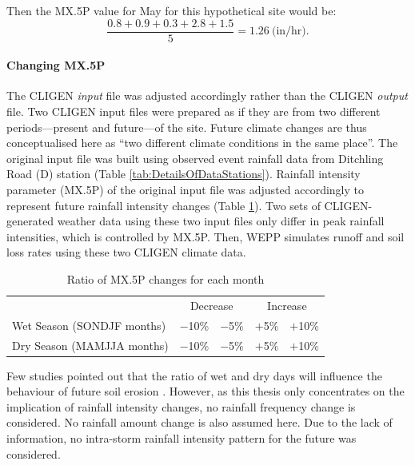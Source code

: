 Then the {MX.5P} value for May for this hypothetical site would be:
\begin{equation}
  \frac{0.8+0.9+0.3+2.8+1.5}{5} = 1.26 \ \textrm{(in/hr)}.
\end{equation}

\paragraph{Changing {MX.5P}} The CLIGEN \emph{input} file was adjusted
accordingly rather than the CLIGEN \textit{output} file. Two CLIGEN input files
were prepared as if they are from two different periods---present and
future---of the site. Future climate changes are thus conceptualised here as
``two different climate conditions in the same place''. The original input file
was built using observed event rainfall data from Ditchling Road (D) station
(Table \ref{tab:DetailsOfDataStations}). Rainfall intensity parameter ({MX.5P})
of the original input file was adjusted accordingly to represent future rainfall
intensity changes (Table \ref{tab:MX5PChanges}). Two sets of CLIGEN-generated
weather data using these two input files only differ in peak rainfall
intensities, which is controlled by {MX.5P}. Then, WEPP simulates runoff and
soil loss rates using these two CLIGEN climate data.

\begin{table}[htpb]
  \centering
  \caption{Ratio of {MX.5P} changes for each month}
  \label{tab:MX5PChanges}
    \begin{tabular}{lcccc}
    \toprule
    & \multicolumn{2}{c}{Decrease} & \multicolumn{2}{c}{Increase} \\
    \cmidrule(r){2-3} \cmidrule(l){4-5}
    Wet Season (SONDJF months)   & $-$10\% &  $-$5\%  & $+$5\%  & $+$10\% \\
    Dry Season (MAMJJA months)   & $-$10\%  & $-$5\%  & $+$5\%  & $+$10\% \\
    \bottomrule
    \end{tabular}
\end{table}

Few studies pointed out that the ratio of wet and dry days will influence the
behaviour of future soil erosion
\citep{nearing2001-229,pruski2002-climate,pruski2002-7}. However, as this thesis
only concentrates on the implication of rainfall intensity changes, no rainfall
frequency change is considered. No rainfall amount change is also assumed here.
Due to the lack of information, no intra-storm rainfall intensity pattern for
the future was considered.

